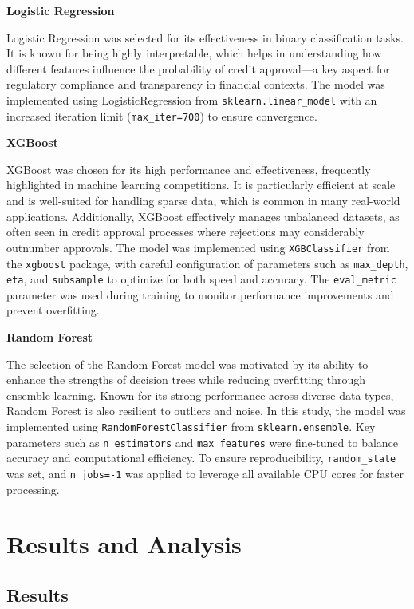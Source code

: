 \documentclass[12pt]{report}
\begin{document}
    {\bfseries Logistic Regression}

    Logistic Regression was selected for its effectiveness in binary classification tasks. It is known for being highly interpretable, which helps in understanding how different features influence the probability of credit approval—a key aspect for regulatory compliance and transparency in financial contexts. The model was implemented using LogisticRegression from \texttt{sklearn.linear\_model} with an increased iteration limit (\texttt{max\_iter=700}) to ensure convergence.

    {\bfseries XGBoost}

    XGBoost was chosen for its high performance and effectiveness, frequently highlighted in machine learning competitions. It is particularly efficient at scale and is well-suited for handling sparse data, which is common in many real-world applications. Additionally, XGBoost effectively manages unbalanced datasets, as often seen in credit approval processes where rejections may considerably outnumber approvals. The model was implemented using \texttt{XGBClassifier} from the \texttt{xgboost} package, with careful configuration of parameters such as \texttt{max\_depth}, \texttt{eta}, and \texttt{subsample} to optimize for both speed and accuracy. The \texttt{eval\_metric} parameter was used during training to monitor performance improvements and prevent overfitting.

    {\bfseries Random Forest}

    The selection of the Random Forest model was motivated by its ability to enhance the strengths of decision trees while reducing overfitting through ensemble learning. Known for its strong performance across diverse data types, Random Forest is also resilient to outliers and noise. In this study, the model was implemented using \texttt{RandomForestClassifier} from \texttt{sklearn.ensemble}. Key parameters such as \texttt{n\_estimators} and \texttt{max\_features} were fine-tuned to balance accuracy and computational efficiency. To ensure reproducibility, \texttt{random\_state} was set, and \texttt{n\_jobs=-1} was applied to leverage all available CPU cores for faster processing.

    \chapter{Results and Analysis}
    \section{Results}
    
\end{document}
